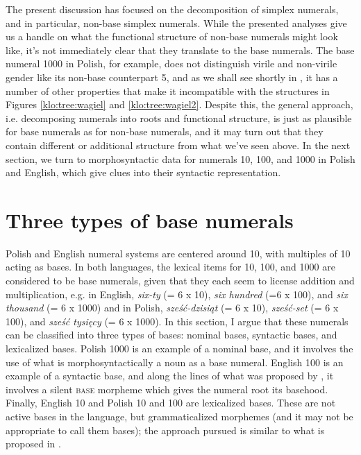 \documentclass[output=paper]{langscibook}
\begin{document}
The present discussion has focused on the decomposition of simplex numerals, and in particular, non-base simplex numerals. While the presented analyses give us a handle on what the functional structure of non-base numerals might look like, it's not immediately clear that they translate to the base numerals. The base numeral 1000 in Polish, for example, does not distinguish virile and non-virile gender like its non-base counterpart 5, and as we shall see shortly in , it has a number of other properties that make it incompatible with the structures in Figures \ref{klo:tree:wagiel} and \ref{klo:tree:wagiel2}. Despite this, the general approach, i.e. decomposing numerals into roots and functional structure, is just as plausible for base numerals as for non-base numerals, and it may turn out that they contain different or additional structure from what we've seen above. In the next section, we turn to morphosyntactic data for numerals 10, 100, and 1000 in Polish and English, which give clues into their syntactic representation.

\section {Three types of base numerals}\label{klo:typesOfBases}

Polish and English numeral systems are centered around 10, with multiples of 10 acting as bases. In both languages, the lexical items for 10, 100, and 1000 are considered to be base numerals, given that they each seem to license addition and multiplication, e.g. in English, \textit{six-ty} (= 6 x 10), \textit{six hundred} (=6 x 100), and \textit{six thousand} (= 6 x 1000) and in Polish, \textit{sześć-dzisiąt} (= 6 x 10), \textit{sześć-set} (= 6 x 100), and \textit{sześć tysięcy} (= 6 x 1000). In this section, I argue that these numerals can be classified into three types of bases: nominal bases, syntactic bases, and lexicalized bases. Polish 1000 is an example of a nominal base, and it involves the use of what is morphosyntactically a noun as a base numeral. English 100 is an example of a syntactic base, and along the lines of what was proposed by \citet{kayne2005bases}, it involves a silent \textsc{base} morpheme which gives the numeral root its basehood. Finally, English 10 and Polish 10 and 100 are lexicalized bases. These are not active bases in the language, but grammaticalized morphemes (and it may not be appropriate to call them bases); the approach pursued is similar to what is proposed in \citet{wagiel2017several}.
\end{document}
